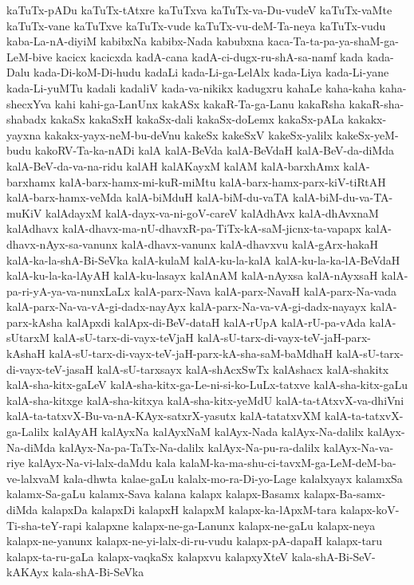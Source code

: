{kaTuTx-pADu
kaTuTx-tAtxre
kaTuTxva
kaTuTx-va-Du-vudeV
kaTuTx-vaMte
kaTuTx-vane
kaTuTxve
kaTuTx-vude
kaTuTx-vu-deM-Ta-neya
kaTuTx-vudu
kaba-La-nA-diyiM
kabibxNa
kabibx-Nada
kabubxna
kaca-Ta-ta-pa-ya-shaM-ga-LeM-bive
kacicx
kacicxda
kadA-cana
kadA-ci-dugx-ru-shA-sa-namf
kada
kada-Dalu
kada-Di-koM-Di-hudu
kadaLi
kada-Li-ga-LelAlx
kada-Liya
kada-Li-yane
kada-Li-yuMTu
kadali
kadaliV
kada-va-nikikx
kadugxru
kahaLe
kaha-kaha
kaha-shecxYva
kahi
kahi-ga-LanUnx
kakASx
kakaR-Ta-ga-Lanu
kakaRsha
kakaR-sha-shabadx
kakaSx
kakaSxH
kakaSx-dali
kakaSx-doLemx
kakaSx-pALa
kakakx-yayxna
kakakx-yayx-neM-bu-deVnu
kakeSx
kakeSxV
kakeSx-yalilx
kakeSx-yeM-budu
kakoRV-Ta-ka-nADi
kalA
kalA-BeVda
kalA-BeVdaH
kalA-BeV-da-diMda
kalA-BeV-da-va-na-ridu
kalAH
kalAKayxM
kalAM
kalA-barxhAmx
kalA-barxhamx
kalA-barx-hamx-mi-kuR-miMtu
kalA-barx-hamx-parx-kiV-tiRtAH
kalA-barx-hamx-veMda
kalA-biMduH
kalA-biM-du-vaTA
kalA-biM-du-va-TA-muKiV
kalAdayxM
kalA-dayx-va-ni-goV-careV
kalAdhAvx
kalA-dhAvxnaM
kalAdhavx
kalA-dhavx-ma-nU-dhavxR-pa-TiTx-kA-saM-jicnx-ta-vapapx
kalA-dhavx-nAyx-sa-vanunx
kalA-dhavx-vanunx
kalA-dhavxvu
kalA-gArx-hakaH
kalA-ka-la-shA-Bi-SeVka
kalA-kulaM
kalA-ku-la-kalA
kalA-ku-la-ka-lA-BeVdaH
kalA-ku-la-ka-lAyAH
kalA-ku-lasayx
kalAnAM
kalA-nAyxsa
kalA-nAyxsaH
kalA-pa-ri-yA-ya-va-nunxLaLx
kalA-parx-Nava
kalA-parx-NavaH
kalA-parx-Na-vada
kalA-parx-Na-va-vA-gi-dadx-nayAyx
kalA-parx-Na-va-vA-gi-dadx-nayayx
kalA-parx-kAsha
kalApxdi
kalApx-di-BeV-dataH
kalA-rUpA
kalA-rU-pa-vAda
kalA-sUtarxM
kalA-sU-tarx-di-vayx-teVjaH
kalA-sU-tarx-di-vayx-teV-jaH-parx-kAshaH
kalA-sU-tarx-di-vayx-teV-jaH-parx-kA-sha-saM-baMdhaH
kalA-sU-tarx-di-vayx-teV-jasaH
kalA-sU-tarxsayx
kalA-shAcxSwTx
kalAshacx
kalA-shakitx
kalA-sha-kitx-gaLeV
kalA-sha-kitx-ga-Le-ni-si-ko-LuLx-tatxve
kalA-sha-kitx-gaLu
kalA-sha-kitxge
kalA-sha-kitxya
kalA-sha-kitx-yeMdU
kalA-ta-tAtxvX-va-dhiVni
kalA-ta-tatxvX-Bu-va-nA-KAyx-satxrX-yasutx
kalA-tatatxvXM
kalA-ta-tatxvX-ga-Lalilx
kalAyAH
kalAyxNa
kalAyxNaM
kalAyx-Nada
kalAyx-Na-dalilx
kalAyx-Na-diMda
kalAyx-Na-pa-TaTx-Na-dalilx
kalAyx-Na-pu-ra-dalilx
kalAyx-Na-va-riye
kalAyx-Na-vi-lalx-daMdu
kala
kalaM-ka-ma-shu-ci-tavxM-ga-LeM-deM-ba-ve-lalxvaM
kala-dhwta
kalae-gaLu
kalalx-mo-ra-Di-yo-Lage
kalalxyayx
kalamxSa
kalamx-Sa-gaLu
kalamx-Sava
kalana
kalapx
kalapx-Basamx
kalapx-Ba-samx-diMda
kalapxDa
kalapxDi
kalapxH
kalapxM
kalapx-ka-lApxM-tara
kalapx-koV-Ti-sha-teY-rapi
kalapxne
kalapx-ne-ga-Lanunx
kalapx-ne-gaLu
kalapx-neya
kalapx-ne-yanunx
kalapx-ne-yi-lalx-di-ru-vudu
kalapx-pA-dapaH
kalapx-taru
kalapx-ta-ru-gaLa
kalapx-vaqkaSx
kalapxvu
kalapxyXteV
kala-shA-Bi-SeV-kAKAyx
kala-shA-Bi-SeVka
}
